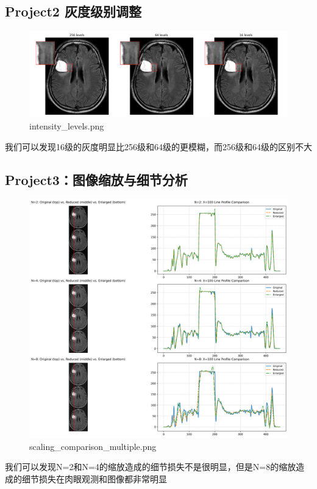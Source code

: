 \documentclass[10.5pt]{config}
\begin{document}
\subsection{Project2 灰度级别调整}
\begin{figure}[htbp]
    \centering
    \includegraphics[width=1.0\linewidth]{figures/intensity_levels.png} %
    \caption{intensity\_levels.png} %
    \label{fig:intensity_levels} %
\end{figure}
我们可以发现16级的灰度明显比256级和64级的更模糊，而256级和64级的区别不大
\clearpage
\subsection{Project3：图像缩放与细节分析}
\begin{figure}[htbp]
    \includegraphics[width=1.0\linewidth]{figures/scaling_comparison_multiple.png} %
    \caption{scaling\_comparison\_multiple.png} %
    \label{fig:scaling_comparison_multiple} %
\end{figure}
我们可以发现N=2和N=4的缩放造成的细节损失不是很明显，但是N=8的缩放造成的细节损失在肉眼观测和图像都非常明显
\clearpage
\end{document}
